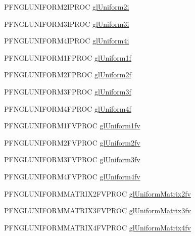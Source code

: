 \begin{DoxyCompactItemize}
\item 
P\+F\+N\+G\+L\+U\+N\+I\+F\+O\+R\+M2\+I\+P\+R\+O\+C \hyperlink{class_agmd_1_1_g_l_context_ad7f89e4e65abf41b31cf2d8baaa029db}{gl\+Uniform2i}
\item 
P\+F\+N\+G\+L\+U\+N\+I\+F\+O\+R\+M3\+I\+P\+R\+O\+C \hyperlink{class_agmd_1_1_g_l_context_a80174807b8c02c8c21bb683fff46fddb}{gl\+Uniform3i}
\item 
P\+F\+N\+G\+L\+U\+N\+I\+F\+O\+R\+M4\+I\+P\+R\+O\+C \hyperlink{class_agmd_1_1_g_l_context_a2ed97832ffb07526bc5b27a4ebb4c020}{gl\+Uniform4i}
\item 
P\+F\+N\+G\+L\+U\+N\+I\+F\+O\+R\+M1\+F\+P\+R\+O\+C \hyperlink{class_agmd_1_1_g_l_context_ad62ede98665e5a0e93c39516955b5401}{gl\+Uniform1f}
\item 
P\+F\+N\+G\+L\+U\+N\+I\+F\+O\+R\+M2\+F\+P\+R\+O\+C \hyperlink{class_agmd_1_1_g_l_context_a00ed73368112b7538f11a7064192c0c5}{gl\+Uniform2f}
\item 
P\+F\+N\+G\+L\+U\+N\+I\+F\+O\+R\+M3\+F\+P\+R\+O\+C \hyperlink{class_agmd_1_1_g_l_context_a2750234474738f10b61b40f56604d9ad}{gl\+Uniform3f}
\item 
P\+F\+N\+G\+L\+U\+N\+I\+F\+O\+R\+M4\+F\+P\+R\+O\+C \hyperlink{class_agmd_1_1_g_l_context_a1d1f3fceb209c0bfadde246fda5288e4}{gl\+Uniform4f}
\item 
P\+F\+N\+G\+L\+U\+N\+I\+F\+O\+R\+M1\+F\+V\+P\+R\+O\+C \hyperlink{class_agmd_1_1_g_l_context_a8435812e978eb65ece3e0ab9ff0fcf0a}{gl\+Uniform1fv}
\item 
P\+F\+N\+G\+L\+U\+N\+I\+F\+O\+R\+M2\+F\+V\+P\+R\+O\+C \hyperlink{class_agmd_1_1_g_l_context_a5dd76848abac5e82c2188642124700d3}{gl\+Uniform2fv}
\item 
P\+F\+N\+G\+L\+U\+N\+I\+F\+O\+R\+M3\+F\+V\+P\+R\+O\+C \hyperlink{class_agmd_1_1_g_l_context_a507d522bcec3dec2081d063ce4b46e36}{gl\+Uniform3fv}
\item 
P\+F\+N\+G\+L\+U\+N\+I\+F\+O\+R\+M4\+F\+V\+P\+R\+O\+C \hyperlink{class_agmd_1_1_g_l_context_ad4fa44817968f90c05298b2769f85b16}{gl\+Uniform4fv}
\item 
P\+F\+N\+G\+L\+U\+N\+I\+F\+O\+R\+M\+M\+A\+T\+R\+I\+X2\+F\+V\+P\+R\+O\+C \hyperlink{class_agmd_1_1_g_l_context_ae8f60b2295cc91da65582ea3f4cf1f57}{gl\+Uniform\+Matrix2fv}
\item 
P\+F\+N\+G\+L\+U\+N\+I\+F\+O\+R\+M\+M\+A\+T\+R\+I\+X3\+F\+V\+P\+R\+O\+C \hyperlink{class_agmd_1_1_g_l_context_a9f8fa99942015ef0573b56ba1012ec44}{gl\+Uniform\+Matrix3fv}
\item 
P\+F\+N\+G\+L\+U\+N\+I\+F\+O\+R\+M\+M\+A\+T\+R\+I\+X4\+F\+V\+P\+R\+O\+C \hyperlink{class_agmd_1_1_g_l_context_a86b23c3f271f3ef14597106bea6ba8a0}{gl\+Uniform\+Matrix4fv}

\end{DoxyCompactItemize}
